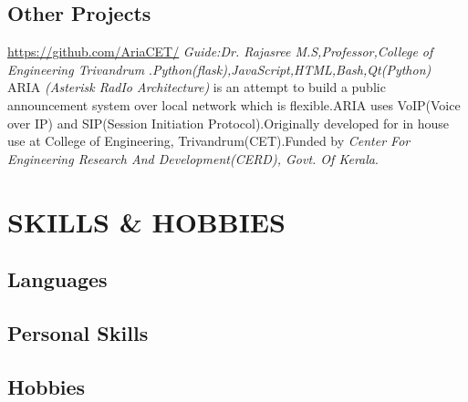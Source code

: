 \documentclass[11pt,a4paper,sans]{moderncv}
\begin{document}
\subsection{Other Projects}

{\newline \url{https://github.com/AriaCET/}}
{\newline \textit{Guide:Dr. Rajasree M.S,Professor,College of Engineering Trivandrum}}
{\newline.\hfill \textit{Python(flask),JavaScript,HTML,Bash,Qt(Python)}}
{ARIA \textit{(Asterisk RadIo Architecture)} is an attempt to build a public announcement system over local network which is flexible.ARIA uses VoIP(Voice over IP) and SIP(Session Initiation Protocol).Originally developed for in house use at College of Engineering, Trivandrum(CET).Funded by \textit{Center For Engineering Research And Development(CERD), Govt. Of Kerala}.\newline}

\section{SKILLS \& HOBBIES}
\subsection{Languages}
	           
\subsection{Personal Skills}
	          
\subsection{Hobbies}

\end{document}
